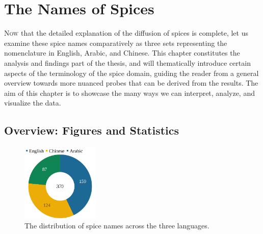 \chapter{The Names of Spices}
\label{ch:names}



\lettrine[lines=\iniciale]{\textcolor{\accentcolor}{N}}{ow} that the detailed explanation of the diffusion of spices is complete, let us examine these spice names comparatively as three sets representing the nomenclature in English, Arabic, and Chinese. This chapter constitutes the analysis and findings part of the thesis, and will thematically introduce certain aspects of the terminology of the spice domain, guiding the reader from a general overview towards more nuanced probes that can be derived from the results. The aim of this chapter is to showcase the many ways we can interpret, analyze, and visualize the data.


\section{Overview: Figures and Statistics}

\begin{figure}
  \vspace{-\baselineskip}
  \includegraphics[width=0.33\textwidth]{imgs/plots/languages_pie.pdf}
  \caption{The distribution of spice names across the three languages.}
  \label{fig:languages_pie}
\end{figure}

